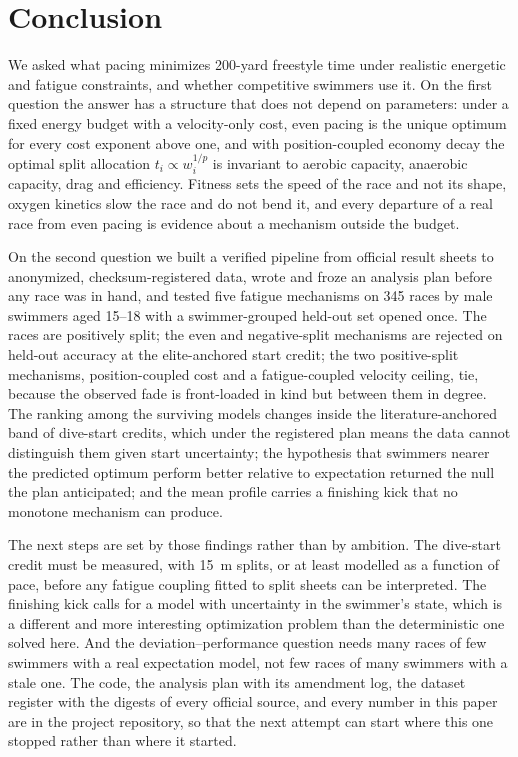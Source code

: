 \section{Conclusion}\label{sec:conclusion}

We asked what pacing minimizes 200-yard freestyle time under realistic
energetic and fatigue constraints, and whether competitive swimmers use it.
On the first question the answer has a structure that does not depend on
parameters: under a fixed energy budget with a velocity-only cost, even
pacing is the unique optimum for every cost exponent above one, and with
position-coupled economy decay the optimal split allocation
$t_i\propto w_i^{1/p}$ is invariant to aerobic capacity, anaerobic
capacity, drag and efficiency. Fitness sets the speed of the race and not
its shape, oxygen kinetics slow the race and do not bend it, and every
departure of a real race from even pacing is evidence about a mechanism
outside the budget.

On the second question we built a verified pipeline from official result
sheets to anonymized, checksum-registered data, wrote and froze an analysis
plan before any race was in hand, and tested five fatigue mechanisms on 345
races by male swimmers aged 15--18 with a swimmer-grouped held-out set
opened once. The races are positively split; the even and negative-split
mechanisms are rejected on held-out accuracy at the elite-anchored start
credit; the two positive-split mechanisms, position-coupled cost and a
fatigue-coupled velocity ceiling, tie, because the observed fade is
front-loaded in kind but between them in degree. The ranking among the
surviving models changes inside the literature-anchored band of dive-start
credits, which under the registered plan means the data cannot distinguish
them given start uncertainty; the hypothesis that swimmers nearer the
predicted optimum perform better relative to expectation returned the null
the plan anticipated; and the mean profile carries a finishing kick that no
monotone mechanism can produce.

The next steps are set by those findings rather than by ambition. The
dive-start credit must be measured, with 15~m splits, or at least modelled
as a function of pace, before any fatigue coupling fitted to split sheets
can be interpreted. The finishing kick calls for a model with uncertainty
in the swimmer's state, which is a different and more interesting
optimization problem than the deterministic one solved here. And the
deviation--performance question needs many races of few swimmers with a
real expectation model, not few races of many swimmers with a stale one.
The code, the analysis plan with its amendment log, the dataset register
with the digests of every official source, and every number in this paper
are in the project repository, so that the next attempt can start where
this one stopped rather than where it started.
